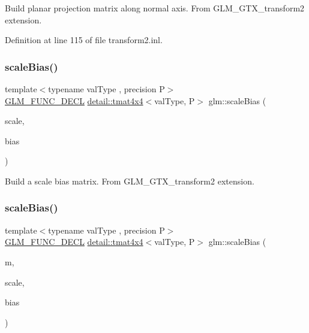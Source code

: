 Build planar projection matrix along normal axis. From G\+L\+M\+\_\+\+G\+T\+X\+\_\+transform2 extension. 

Definition at line 115 of file transform2.\+inl.

\mbox{\label{group__gtx__transform2_ga0a387ae1a7fd1a2ca451ac47833ee3e2}} 
\subsubsection{\texorpdfstring{scale\+Bias()}{scaleBias()}\hspace{0.1cm}{\footnotesize\ttfamily [1/2]}}
{\footnotesize\ttfamily template$<$typename val\+Type , precision P$>$ \\
\hyperlink{setup_8hpp_ab2d052de21a70539923e9bcbf6e83a51}{G\+L\+M\+\_\+\+F\+U\+N\+C\+\_\+\+D\+E\+CL} \hyperlink{structglm_1_1detail_1_1tmat4x4}{detail\+::tmat4x4}$<$val\+Type, P$>$ glm\+::scale\+Bias (\begin{DoxyParamCaption}\item[{val\+Type}]{scale,  }\item[{val\+Type}]{bias }\end{DoxyParamCaption})}

Build a scale bias matrix. From G\+L\+M\+\_\+\+G\+T\+X\+\_\+transform2 extension. \mbox{\label{group__gtx__transform2_gae733630f90c53ca3dce8daf50f25d6ab}} 
\subsubsection{\texorpdfstring{scale\+Bias()}{scaleBias()}\hspace{0.1cm}{\footnotesize\ttfamily [2/2]}}
{\footnotesize\ttfamily template$<$typename val\+Type , precision P$>$ \\
\hyperlink{setup_8hpp_ab2d052de21a70539923e9bcbf6e83a51}{G\+L\+M\+\_\+\+F\+U\+N\+C\+\_\+\+D\+E\+CL} \hyperlink{structglm_1_1detail_1_1tmat4x4}{detail\+::tmat4x4}$<$val\+Type, P$>$ glm\+::scale\+Bias (\begin{DoxyParamCaption}\item[{\hyperlink{structglm_1_1detail_1_1tmat4x4}{detail\+::tmat4x4}$<$ val\+Type, P $>$ const \&}]{m,  }\item[{val\+Type}]{scale,  }\item[{val\+Type}]{bias }\end{DoxyParamCaption})}

